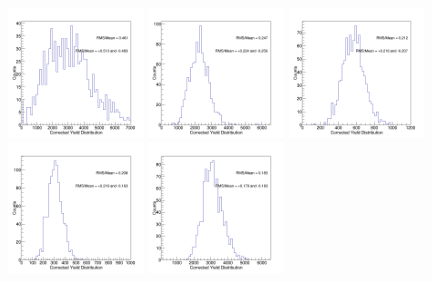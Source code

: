 \begin{figure}[h]
\begin{center}
\includegraphics[width= 0.32\textwidth]{Figures/Chapter5/BsCorrYield_0_90_7-10_Assym.png}
\includegraphics[width= 0.32\textwidth]{Figures/Chapter5/BsCorrYield_0_90_10-15_Assym.png}
\includegraphics[width= 0.32\textwidth]{Figures/Chapter5/BsCorrYield_0_90_15-20_Assym.png}
\includegraphics[width= 0.32\textwidth]{Figures/Chapter5/BsCorrYield_0_90_20-50_Assym.png}
\includegraphics[width= 0.32\textwidth]{Figures/Chapter5/BsCorrYield_0_90_10-50_Assym.png}

\end{center}
\end{figure}
